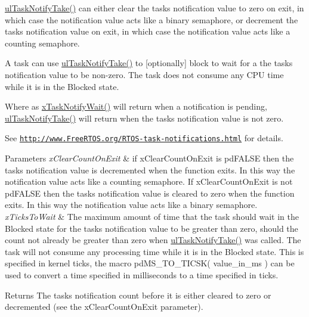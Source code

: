 \hyperlink{task_8h_a66540bef602522a01a519f776e4c07d8}{ul\+Task\+Notify\+Take()} can either clear the task\textquotesingle{}s notification value to zero on exit, in which case the notification value acts like a binary semaphore, or decrement the task\textquotesingle{}s notification value on exit, in which case the notification value acts like a counting semaphore.

A task can use \hyperlink{task_8h_a66540bef602522a01a519f776e4c07d8}{ul\+Task\+Notify\+Take()} to \mbox{[}optionally\mbox{]} block to wait for a the task\textquotesingle{}s notification value to be non-\/zero. The task does not consume any C\+PU time while it is in the Blocked state.

Where as \hyperlink{task_8h_a0475fcda9718f403521c270a7270ff93}{x\+Task\+Notify\+Wait()} will return when a notification is pending, \hyperlink{task_8h_a66540bef602522a01a519f776e4c07d8}{ul\+Task\+Notify\+Take()} will return when the task\textquotesingle{}s notification value is not zero.

See \href{http://www.FreeRTOS.org/RTOS-task-notifications.html}{\tt http\+://www.\+Free\+R\+T\+O\+S.\+org/\+R\+T\+O\+S-\/task-\/notifications.\+html} for details.


\begin{DoxyParams}{Parameters}
{\em x\+Clear\+Count\+On\+Exit} & if x\+Clear\+Count\+On\+Exit is pd\+F\+A\+L\+SE then the task\textquotesingle{}s notification value is decremented when the function exits. In this way the notification value acts like a counting semaphore. If x\+Clear\+Count\+On\+Exit is not pd\+F\+A\+L\+SE then the task\textquotesingle{}s notification value is cleared to zero when the function exits. In this way the notification value acts like a binary semaphore.\\
\hline
{\em x\+Ticks\+To\+Wait} & The maximum amount of time that the task should wait in the Blocked state for the task\textquotesingle{}s notification value to be greater than zero, should the count not already be greater than zero when \hyperlink{task_8h_a66540bef602522a01a519f776e4c07d8}{ul\+Task\+Notify\+Take()} was called. The task will not consume any processing time while it is in the Blocked state. This is specified in kernel ticks, the macro pd\+M\+S\+\_\+\+T\+O\+\_\+\+T\+I\+C\+S\+K( value\+\_\+in\+\_\+ms ) can be used to convert a time specified in milliseconds to a time specified in ticks.\\
\hline
\end{DoxyParams}
\begin{DoxyReturn}{Returns}
The task\textquotesingle{}s notification count before it is either cleared to zero or decremented (see the x\+Clear\+Count\+On\+Exit parameter). 
\end{DoxyReturn}
